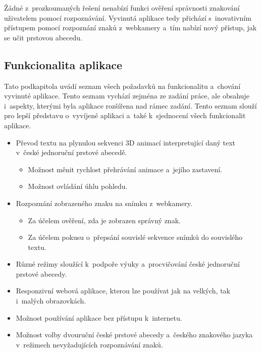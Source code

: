 \documentclass[
  master,
  program=ainfvs,
  biblatex,
  figures=true,
  tables=false,
  sourcecodes=true,
  glossaries,
  index
]{kidiplom}
\begin{document}
         Žádné z~prozkoumaných řešení nenabízí funkci ověření správnosti znakování uživatelem pomocí rozpoznávání. Vyvinutá aplikace tedy přichází s~inovativním přístupem pomocí rozpoznání znaků z~webkamery a~tím nabízí nový přístup, jak se učit prstovou abecedu.

     \subsection{Funkcionalita aplikace}
       Tato podkapitola uvádí seznam všech požadavků na funkcionalitu a~chování vyvinuté aplikace. Tento seznam vychází zejména ze zadání práce, ale obsahuje i~aspekty, kterými byla aplikace rozšířena nad rámec zadání. Tento seznam slouží pro lepší představu o~vyvíjené aplikaci a~také k~sjednocení všech funkcionalit aplikace.

        \begin{itemize}
            \item Převod textu na plynulou sekvenci 3D animací interpretující daný text v~české jednoruční prstové abecedě.
            \begin{itemize}
                \item Možnost měnit rychlost přehrávání animace a~jejího zastavení.
                \item Možnost ovládání úhlu pohledu.
            \end{itemize}
            
            \item Rozpoznání zobrazeného znaku na snímku z~webkamery.
            
            \begin{itemize}
                \item Za účelem ověření, zda je zobrazen správný znak.
                \item Za účelem pokusu o~přepsání souvislé sekvence snímků do souvislého textu.
            \end{itemize}
            
            \item Různé režimy sloužící k~podpoře výuky a~procvičování české jednoruční prstové abecedy.
            
            \item Responzivní webová aplikace, kterou lze používat jak na velkých, tak i~malých obrazovkách.
            
            \item Možnost používání aplikace bez přístupu k~internetu.
            
            \item Možnost volby dvouruční české prstové abecedy a~českého znakového jazyka v~režimech nevyžadujících rozpoznávání znaků.
        \end{itemize}
\end{document}

